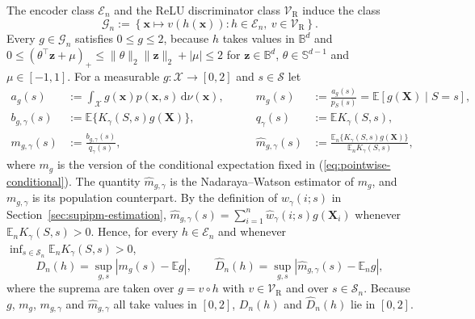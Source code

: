 \documentclass{article} %
\begin{document}
The encoder class $\mathcal{E}_n$ and the ReLU discriminator class $\mathcal{V}_{\mathrm{R}}$ induce the class
\begin{equation}
  \mathcal{G}_n:=\left\{\mathbf{x}\mapsto v(h(\mathbf{x})):
    h\in\mathcal{E}_n,\ v\in\mathcal{V}_{\mathrm{R}}\right\} .
  \label{eq:score-class}
\end{equation}
Every $g\in\mathcal{G}_n$ satisfies $0\le g\le2$, because $h$ takes values in $\mathbb{B}^d$ and $0\le(\theta^\top\mathbf{z}+\mu)_+\le\lVert\theta\rVert_2\lVert\mathbf{z}\rVert_2+|\mu|\le2$ for $\mathbf{z}\in\mathbb{B}^d$, $\theta\in\mathbb{S}^{d-1}$ and $\mu\in[-1,1]$.  For a measurable $g:\mathcal{X}\to[0,2]$ and $s\in\mathcal{S}$ let
\begin{equation}
\begin{aligned}
  a_g(s)&:=\int_{\mathcal{X}}g(\mathbf{x})p(\mathbf{x},s)\,\mathrm{d}\nu(\mathbf{x}),
  &\qquad
  m_g(s)&:=\frac{a_g(s)}{p_S(s)}=\mathbb{E}[g(\mathbf{X})\mid S=s],
  \\
  b_{g,\gamma}(s)&:=\mathbb{E}\{K_{\gamma}(S,s)g(\mathbf{X})\},
  &\qquad
  q_{\gamma}(s)&:=\mathbb{E}K_{\gamma}(S,s),
  \\
  m_{g,\gamma}(s)&:=\frac{b_{g,\gamma}(s)}{q_{\gamma}(s)},
  &\qquad
  \widehat{m}_{g,\gamma}(s)
  &:=\frac{\mathbb{E}_n\{K_{\gamma}(S,s)g(\mathbf{X})\}}{\mathbb{E}_nK_{\gamma}(S,s)},
\end{aligned}
  \label{eq:app-notation}
\end{equation}
where $m_g$ is the version of the conditional expectation fixed in (\ref{eq:pointwise-conditional}).  
The quantity $\widehat{m}_{g,\gamma}$ is the Nadaraya--Watson estimator of $m_g$, and $m_{g,\gamma}$ is its population counterpart.
By the definition of $\widehat{w}_{\gamma}(i;s)$ in Section~\ref{sec:supipm-estimation}, $\widehat{m}_{g,\gamma}(s)=\sum_{i=1}^n\widehat{w}_{\gamma}(i;s)g(\mathbf{X}_i)$ whenever $\mathbb{E}_nK_{\gamma}(S,s)>0$.  Hence, for every $h\in\mathcal{E}_n$ and whenever $\inf_{s\in\mathcal{S}_n}\mathbb{E}_nK_{\gamma}(S,s)>0$,
\begin{equation}
  D_n(h)=\sup_{g,s}\left|m_g(s)-\mathbb{E}g\right|,
  \qquad
  \widehat{D}_n(h)=\sup_{g,s}\left|\widehat{m}_{g,\gamma}(s)-\mathbb{E}_ng\right| ,
  \label{eq:D-in-scores}
\end{equation}
where the suprema are taken over $g=v\circ h$ with $v\in\mathcal{V}_{\mathrm{R}}$ and over $s\in\mathcal{S}_n$.  Because $g$, $m_g$, $m_{g,\gamma}$ and $\widehat{m}_{g,\gamma}$ all take values in $[0,2]$, $D_n(h)$ and $\widehat{D}_n(h)$ lie in $[0,2]$.
\end{document}
